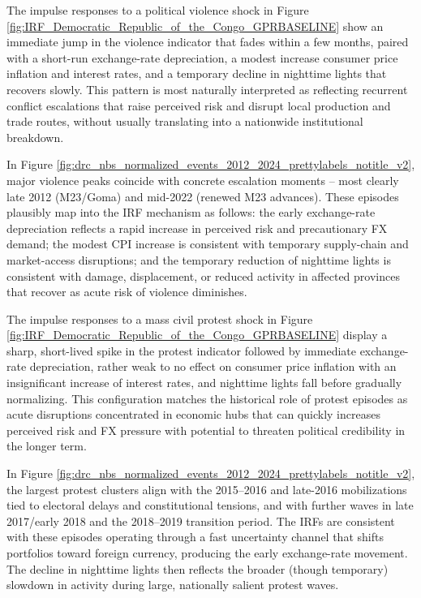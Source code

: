 \documentclass[12pt,a4paper,fleqn]{article}
\begin{document}
The impulse responses to a political violence shock in Figure \ref{fig:IRF_Democratic_Republic_of_the_Congo_GPRBASELINE} show an immediate jump in the violence indicator that fades within a few months, paired with a short-run exchange-rate depreciation, a modest increase consumer price inflation and interest rates, and a temporary decline in nighttime lights that recovers slowly. This pattern is most naturally interpreted as reflecting recurrent conflict escalations that raise perceived risk and disrupt local production and trade routes, without usually translating into a nationwide institutional breakdown. %

In Figure \ref{fig:drc_nbs_normalized_events_2012_2024_prettylabels_notitle_v2}, major violence peaks coincide with concrete escalation moments -- most clearly late 2012 (M23/Goma) and mid-2022 (renewed M23 advances). These episodes plausibly map into the IRF mechanism as follows: the early exchange-rate depreciation reflects a rapid increase in perceived risk and precautionary FX demand; the modest CPI increase is consistent with temporary supply-chain and market-access disruptions; and the temporary reduction of nighttime lights is consistent with damage, displacement, or reduced activity in affected provinces that recover as acute risk of violence diminishes.

The impulse responses to a mass civil protest shock in Figure \ref{fig:IRF_Democratic_Republic_of_the_Congo_GPRBASELINE} display a sharp, short-lived spike in the protest indicator followed by immediate exchange-rate depreciation, rather weak to no effect on consumer price inflation with an insignificant increase of interest rates, and nighttime lights fall before gradually normalizing. This configuration matches the historical role of protest episodes as acute disruptions concentrated in economic hubs that can quickly increases perceived risk and FX pressure with potential to threaten political credibility in the longer term. %

In Figure \ref{fig:drc_nbs_normalized_events_2012_2024_prettylabels_notitle_v2}, the largest protest clusters align with the 2015–2016 and late-2016 mobilizations tied to electoral delays and constitutional tensions, and with further waves in late 2017/early 2018 and the 2018–2019 transition period. The IRFs are consistent with these episodes operating through a fast uncertainty channel that shifts portfolios toward foreign currency, producing the early exchange-rate movement. The decline in nighttime lights then reflects the broader (though temporary) slowdown in activity during large, nationally salient protest waves.
\end{document}
